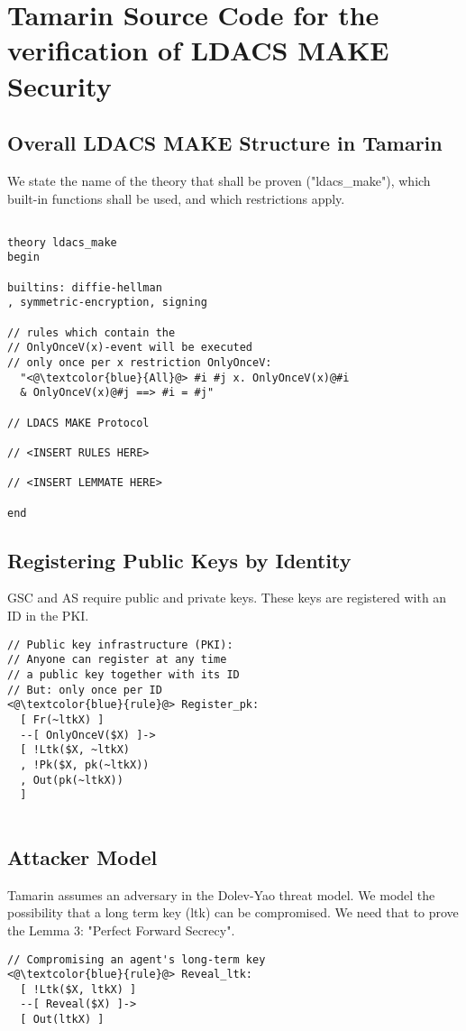\section{Tamarin Source Code for the verification of LDACS MAKE Security}
\label{TamarinCode}

\subsection{Overall LDACS MAKE Structure in Tamarin}

We state the name of the theory that shall be proven ("ldacs\_make"),  which built-in functions shall be used, and which restrictions apply.

\begin{lstlisting}

theory ldacs_make
begin

builtins: diffie-hellman
, symmetric-encryption, signing

// rules which contain the 
// OnlyOnceV(x)-event will be executed 
// only once per x restriction OnlyOnceV:
  "<@\textcolor{blue}{All}@> #i #j x. OnlyOnceV(x)@#i 
  & OnlyOnceV(x)@#j ==> #i = #j"
  
// LDACS MAKE Protocol

// <INSERT RULES HERE>

// <INSERT LEMMATE HERE>

end

\end{lstlisting}

\subsection{Registering Public Keys by Identity}

GSC and AS require public and private keys. These keys are registered with an ID in the PKI.

\begin{lstlisting}
// Public key infrastructure (PKI):
// Anyone can register at any time 
// a public key together with its ID
// But: only once per ID
<@\textcolor{blue}{rule}@> Register_pk:
  [ Fr(~ltkX) ]
  --[ OnlyOnceV($X) ]->
  [ !Ltk($X, ~ltkX)
  , !Pk($X, pk(~ltkX))
  , Out(pk(~ltkX)) 
  ] 
  
\end{lstlisting}

\subsection{Attacker Model}
\label{attackermodel}
Tamarin assumes an adversary in the Dolev-Yao threat model. We model the possibility that a long term key (ltk) can be compromised. We need that to prove the Lemma 3: "Perfect Forward Secrecy".
\begin{lstlisting}
// Compromising an agent's long-term key
<@\textcolor{blue}{rule}@> Reveal_ltk:
  [ !Ltk($X, ltkX) ] 
  --[ Reveal($X) ]-> 
  [ Out(ltkX) ]
\end{lstlisting}

